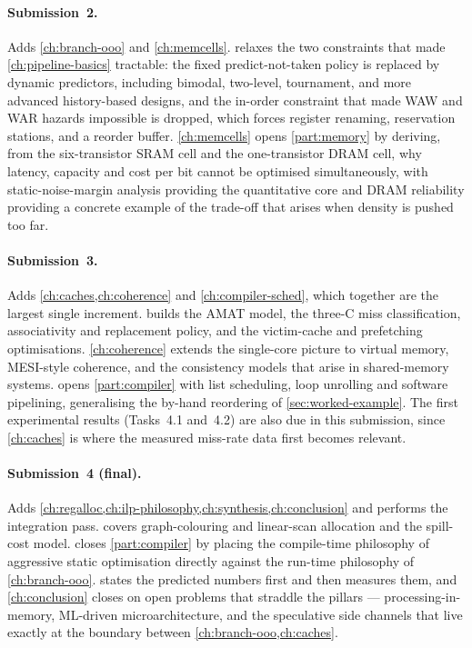 \documentclass[11pt,a4paper]{report}
\begin{document}
\paragraph{Submission~2.} Adds \cref{ch:branch-ooo} and
\cref{ch:memcells}.  relaxes the two constraints
that made \cref{ch:pipeline-basics} tractable: the fixed
predict-not-taken policy is replaced by dynamic predictors, including
bimodal, two-level, tournament, and more advanced history-based
designs, and the in-order constraint that made WAW and WAR hazards
impossible is dropped, which forces register renaming, reservation
stations, and a reorder buffer. \cref{ch:memcells} opens
\cref{part:memory} by deriving, from the six-transistor SRAM cell and
the one-transistor DRAM cell, why latency, capacity and cost per bit
cannot be optimised simultaneously, with static-noise-margin analysis
providing the quantitative core and DRAM reliability providing a
concrete example of the trade-off that arises when density is pushed
too far.

\paragraph{Submission~3.} Adds \cref{ch:caches,ch:coherence} and
\cref{ch:compiler-sched}, which together are the largest single
increment.  builds the AMAT model, the three-C miss
classification, associativity and replacement policy, and the
victim-cache and prefetching optimisations. \cref{ch:coherence} extends
the single-core picture to virtual memory, MESI-style coherence, and
the consistency models that arise in shared-memory systems.
 opens \cref{part:compiler} with list
scheduling, loop unrolling and software pipelining, generalising the
by-hand reordering of \cref{sec:worked-example}. The first experimental
results (Tasks~4.1 and~4.2) are also due in this submission, since
\cref{ch:caches} is where the measured miss-rate data first becomes
relevant.

\paragraph{Submission~4 (final).} Adds
\cref{ch:regalloc,ch:ilp-philosophy,ch:synthesis,ch:conclusion} and
performs the integration pass.  covers graph-colouring
and linear-scan allocation and the spill-cost model.
 closes \cref{part:compiler} by placing the
compile-time philosophy of aggressive static optimisation directly
against the run-time philosophy of \cref{ch:branch-ooo}.
 states the predicted numbers first and then
measures them, and \cref{ch:conclusion} closes on open problems that
straddle the pillars --- processing-in-memory, ML-driven
microarchitecture, and the speculative side channels that live
exactly at the boundary between
\cref{ch:branch-ooo,ch:caches}.
\end{document}
